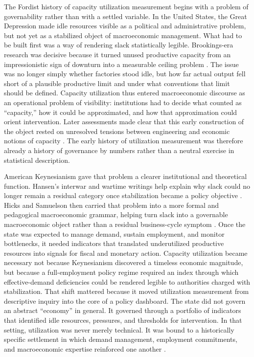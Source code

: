 \documentclass[11pt,a4paper]{article}
\begin{document}
The Fordist history of capacity utilization measurement begins with a problem of governability rather than with a settled variable. In the United States, the Great Depression made idle resources visible as a political and administrative problem, but not yet as a stabilized object of macroeconomic management. What had to be built first was a way of rendering slack statistically legible. Brookings-era research was decisive because it turned unused productive capacity from an impressionistic sign of downturn into a measurable ceiling problem \citep{Nourse1934}. The issue was no longer simply whether factories stood idle, but how far actual output fell short of a plausible productive limit and under what conventions that limit should be defined. Capacity utilization thus entered macroeconomic discourse as an operational problem of visibility: institutions had to decide what counted as ``capacity,'' how it could be approximated, and how that approximation could orient intervention. Later assessments made clear that this early construction of the object rested on unresolved tensions between engineering and economic notions of capacity \citep{Burns1954,KleinDavid1958}. The early history of utilization measurement was therefore already a history of governance by numbers rather than a neutral exercise in statistical description.

American Keynesianism gave that problem a clearer institutional and theoretical function. Hansen’s interwar and wartime writings help explain why slack could no longer remain a residual category once stabilization became a policy objective \citep{Hansen1936,Hansen1941}. Hicks and Samuelson then carried that problem into a more formal and pedagogical macroeconomic grammar, helping turn slack into a governable macroeconomic object rather than a residual business-cycle symptom \citep{Hicks1937,Samuelson1947,Samuelson1948}. Once the state was expected to manage demand, sustain employment, and monitor bottlenecks, it needed indicators that translated underutilized productive resources into signals for fiscal and monetary action. Capacity utilization became necessary not because Keynesianism discovered a timeless economic magnitude, but because a full-employment policy regime required an index through which effective-demand deficiencies could be rendered legible to authorities charged with stabilization. That shift mattered because it moved utilization measurement from descriptive inquiry into the core of a policy dashboard. The state did not govern an abstract ``economy'' in general. It governed through a portfolio of indicators that identified idle resources, pressures, and thresholds for intervention. In that setting, utilization was never merely technical. It was bound to a historically specific settlement in which demand management, employment commitments, and macroeconomic expertise reinforced one another \citep{Barber1987}.
\end{document}
